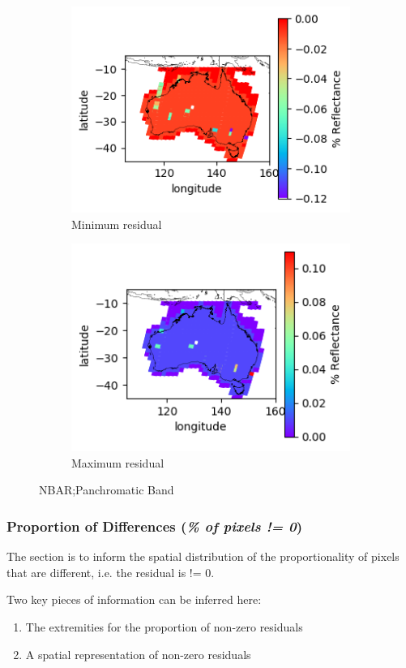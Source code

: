 \documentclass[a4paper]{article}
\begin{document}
      \begin{figure}[h!]
        \centering
          \begin{subfigure}[l]{.4\linewidth}
            \hspace{-32mm}
            \includegraphics[scale=0.9]{plots/nbar/nbar_panchromatic-MinResidual.png}
            \caption{Minimum residual}
          \end{subfigure}
%
          \begin{subfigure}[r]{.4\linewidth}
            \includegraphics[scale=0.9]{plots/nbar/nbar_panchromatic-MaxResidual.png}
            \caption{Maximum residual}
          \end{subfigure}
        \caption{NBAR;\@ Panchromatic Band}\label{figure:14}
      \end{figure}

  \clearpage

    \subsubsection{Proportion of Differences (\textit{\% of pixels != 0})}

      \begin{flushleft}
        The section is to inform the spatial distribution of the proportionality of pixels that are different, i.e. the residual is != 0. \par
        Two key pieces of information can be inferred here:
        \begin{enumerate}
          \item The extremities for the proportion of non-zero residuals
          \item A spatial representation of non-zero residuals
        \end{enumerate}
      \end{flushleft}
\end{document}

